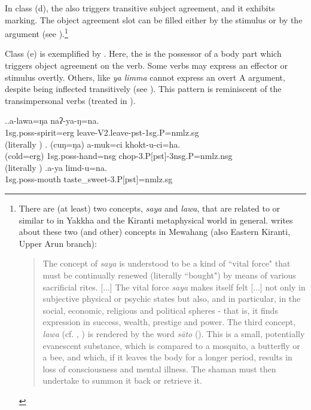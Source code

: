 \newpage
In class (d), the  also triggers transitive subject agreement, and it exhibits  marking. The object agreement slot can be filled either by  the stimulus  or by the  argument (see \Next[a]).\footnote{There are (at least) two concepts, \emph{saya} and \emph{lawa}, that are related to or similar to  in Yakkha and the Kiranti metaphysical world in general.  \citet{Gaenszle2000Origins} writes about these two (and other) concepts in Mewahang (also Eastern Kiranti, Upper Arun branch): 

\begin{quote}
The concept of \emph{saya} is understood to be a kind of “vital force" that must be continually renewed (literally “bought") by means of various sacrificial rites. [...] The vital force \emph{saya} makes itself felt [...] not only in subjective physical or psychic states but also, and in particular, in the social, economic, religious and political spheres - that is, it finds expression in success, wealth, prestige and power. The third concept, \emph{lawa} (cf. \citet[165]{Hardman1981The-psychology}, \citealt[299]{Hardman_phd_Conformity}) is rendered by the  word \emph{sāto} (). This is a small, potentially evanescent substance, which is compared to a mosquito, a butterfly or a bee, and which, if it leaves the body for a longer period, results in loss of consciousness and mental illness. The shaman must then undertake to summon it back or retrieve it. \citep[119]{Gaenszle2000Origins} 
\end{quote}
}

Class (e) is exemplified by \Next[b]. Here, the  is the possessor of a body part  which triggers object agreement on the verb. Some verbs may express an effector or stimulus overtly. Others, like \emph{ya limma}  cannot express an overt A argument, despite being inflected transitively (see \Next[c]). This pattern is reminiscent of the transimpersonal verbs (treated in ).

 \ex.\ag.\label{ex-lawa}a-lawa=ŋa naʔ-ya-ŋ=na.\\
 {\sc 1sg.poss-}spirit{\sc =erg} leave{\sc -V2.leave-pst-1sg.P=nmlz.sg}\\
  (literally )
 \bg. (cuŋ=ŋa) a-muk=ci khokt-u-ci=ha.\\
 (cold{\sc =erg}) {\sc 1sg.poss-}hand{\sc =nsg} chop{\sc -3.P[pst]-3nsg.P=nmlz.nsg}\\
 (literally )
\bg.a-ya limd-u=na.\\
{\sc 1sg.poss-}mouth taste\_sweet{\sc -3.P[pst]=nmlz.sg}\\

